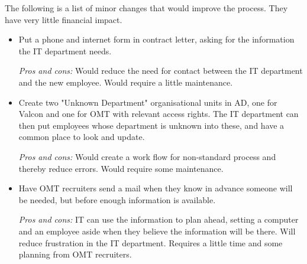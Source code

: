 The following is a list of minor changes that would improve the process.
They have very little financial impact.
\begin{itemize}
\item Put a phone and internet form in contract letter, asking for the information the IT department needs.

\emph{Pros and cons:} Would reduce the need for contact between the IT department and the new employee.
Would require a little maintenance.

\item Create two "Unknown Department" organisational units in AD, one for Valcon and one for OMT with relevant access rights. The IT department can then put employees whose department is unknown into these, and have a common place to look and update.

\emph{Pros and cons:} Would create a work flow for non-standard process and thereby reduce errors. Would require some maintenance.

\item Have OMT recruiters send a mail when they know in advance someone will be needed, but before enough information is available.

\emph{Pros and cons:} IT can use the information to plan ahead, setting a computer and an employee aside when they believe the information will be there. Will reduce frustration in the IT department. Requires a little time and some planning from OMT recruiters.
\end{itemize}
